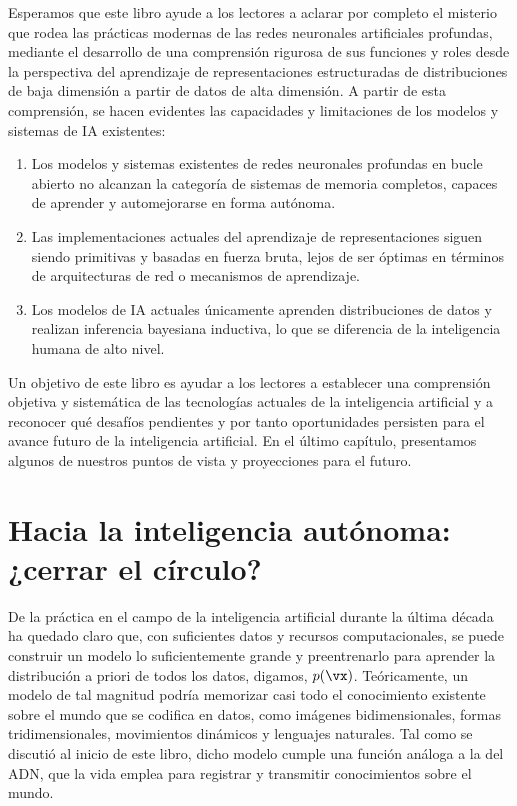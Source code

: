 \documentclass[../../book-main_es.tex]{subfiles}
\begin{document}
Esperamos que este libro ayude a los lectores a aclarar por completo el misterio que rodea 
las prácticas modernas de las redes neuronales artificiales profundas, mediante el desarrollo 
de una comprensión rigurosa de sus funciones y roles desde la perspectiva del aprendizaje de representaciones estructuradas de 
distribuciones de baja dimensión a partir de datos de alta dimensión.
A partir de esta comprensión, se hacen evidentes las capacidades y limitaciones de los modelos 
y sistemas de IA existentes:
\begin{enumerate}
    \item Los modelos y sistemas existentes de redes neuronales profundas en bucle abierto no alcanzan la categoría de sistemas de memoria completos, 
      capaces de aprender y automejorarse en forma autónoma.
    \item Las implementaciones actuales del aprendizaje de representaciones siguen siendo primitivas 
      y basadas en fuerza bruta, lejos de ser óptimas en términos de arquitecturas de red 
      o mecanismos de aprendizaje.
    \item Los modelos de IA actuales únicamente aprenden distribuciones de datos y realizan 
      inferencia bayesiana inductiva, lo que se diferencia de la inteligencia humana de alto nivel.
\end{enumerate}

Un objetivo de este libro es ayudar a los lectores a establecer una comprensión objetiva y sistemática 
de las tecnologías actuales de la inteligencia artificial y a reconocer qué desafíos pendientes y 
por tanto oportunidades persisten para el avance futuro de la inteligencia artificial. En el último capítulo, 
presentamos algunos de nuestros puntos de vista y proyecciones para el futuro. 

\section{Hacia la inteligencia autónoma: ¿cerrar el círculo?}
De la práctica en el campo de la inteligencia artificial durante la última década ha quedado 
claro que, con suficientes datos y recursos computacionales, se puede construir un modelo 
lo suficientemente grande y preentrenarlo para aprender la distribución a priori de todos los 
datos, digamos, \(p(\vx)\). Teóricamente, un modelo de tal magnitud podría memorizar casi todo 
el conocimiento existente sobre el mundo que se codifica en datos, como imágenes bidimensionales, 
formas tridimensionales, movimientos dinámicos y lenguajes naturales. Tal como se discutió al 
inicio de este libro, dicho modelo cumple una función análoga a la del ADN, que la vida emplea 
para registrar y transmitir conocimientos sobre el mundo.
\end{document}
